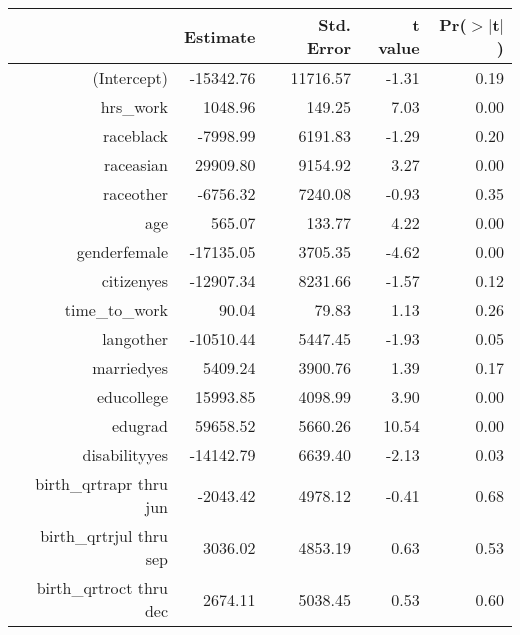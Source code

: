 \documentclass[slidestop,compress,mathserif,12pt,t,professionalfonts,xcolor=table]{beamer}
\begin{document}

\begin{frame}[shrink]


\begin{center}
{\tiny
\begin{tabular}{rrrrr}
  \hline
 & Estimate & Std. Error & t value & Pr($>$$|$t$|$) \\ 
  \hline
(Intercept) & -15342.76 & 11716.57 & -1.31 & 0.19 \\ 
  hrs\_work & 1048.96 & 149.25 & 7.03 & 0.00 \\ 
  raceblack & -7998.99 & 6191.83 & -1.29 & 0.20 \\ 
  raceasian & 29909.80 & 9154.92 & 3.27 & 0.00 \\ 
  raceother & -6756.32 & 7240.08 & -0.93 & 0.35 \\ 
  age & 565.07 & 133.77 & 4.22 & 0.00 \\ 
  genderfemale & -17135.05 & 3705.35 & -4.62 & 0.00 \\ 
  citizenyes & -12907.34 & 8231.66 & -1.57 & 0.12 \\ 
  time\_to\_work & 90.04 & 79.83 & 1.13 & 0.26 \\ 
  langother & -10510.44 & 5447.45 & -1.93 & 0.05 \\ 
  marriedyes & 5409.24 & 3900.76 & 1.39 & 0.17 \\ 
  educollege & 15993.85 & 4098.99 & 3.90 & 0.00 \\ 
  edugrad & 59658.52 & 5660.26 & 10.54 & 0.00 \\ 
  disabilityyes & -14142.79 & 6639.40 & -2.13 & 0.03 \\ 
  birth\_qrtrapr thru jun & -2043.42 & 4978.12 & -0.41 & 0.68 \\ 
  birth\_qrtrjul thru sep & 3036.02 & 4853.19 & 0.63 & 0.53 \\ 
  birth\_qrtroct thru dec & 2674.11 & 5038.45 & 0.53 & 0.60 \\ 
   \hline
\end{tabular}
}
\end{center}

\end{frame}
\end{document}
